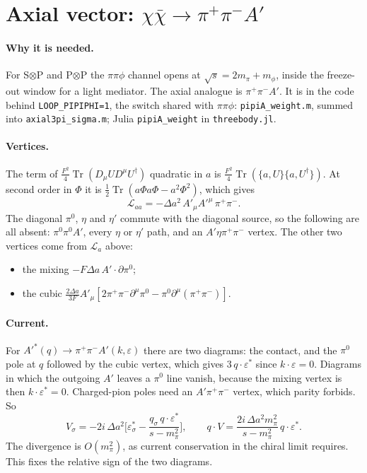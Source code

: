 \documentclass{article}
\newcommand{\tr}{\operatorname{Tr}}
\newcommand{\mpi}{m_\pi}
\newcommand{\Da}{\Delta a}
\begin{document}
\section{Axial vector: $\chi\bar\chi\to\pi^+\pi^-A'$}
\label{sec:pipiA}

\paragraph{Why it is needed.} For S$\otimes$P and P$\otimes$P the $\pi\pi\phi$ channel opens at
$\sqrt s=2m_\pi+m_\phi$, inside the freeze-out window for a light mediator. The axial analogue is
$\pi^+\pi^-A'$. It is in the code behind \texttt{LOOP\_PIPIPHI=1}, the switch shared with
$\pi\pi\phi$: \texttt{pipiA\_weight.m}, summed into \texttt{axial3pi\_sigma.m}; Julia
\texttt{pipiA\_weight} in \texttt{threebody.jl}.

\paragraph{Vertices.} The term of $\tfrac{F^2}{4}\tr(D_\mu U D^\mu U^\dagger)$ quadratic in $a$ is
$\tfrac{F^2}{4}\tr(\{a,U\}\{a,U^\dagger\})$. At second order in $\Phi$ it is
$\tfrac12\tr(a\Phi a\Phi-a^2\Phi^2)$, which gives
\begin{equation}
  \mathcal L_{aa}=-\Da^2\,A'_\mu A'^\mu\,\pi^+\pi^- .
\end{equation}
The diagonal $\pi^0$, $\eta$ and $\eta'$ commute with the diagonal source, so the following are all
absent: $\pi^0\pi^0A'$, every $\eta$ or $\eta'$ path, and an $A'\eta\pi^+\pi^-$ vertex. The other
two vertices come from $\mathcal L_a$ above:
\begin{itemize}
\item the mixing $-F\Da\,A'\!\cdot\partial\pi^0$;
\item the cubic $\tfrac{2\Da}{3F}A'_\mu[2\pi^+\pi^-\partial^\mu\pi^0-\pi^0\partial^\mu(\pi^+\pi^-)]$.
\end{itemize}

\paragraph{Current.} For $A'^*(q)\to\pi^+\pi^-A'(k,\varepsilon)$ there are two diagrams: the
contact, and the $\pi^0$ pole at $q$ followed by the cubic vertex, which gives $3\,q\!\cdot\!\varepsilon^*$
since $k\cdot\varepsilon=0$. Diagrams in which the outgoing $A'$ leaves a $\pi^0$ line vanish,
because the mixing vertex is then $k\cdot\varepsilon^*=0$. Charged-pion poles need an
$A'\pi^+\pi^-$ vertex, which parity forbids. So
\begin{equation}
  V_\sigma=-2i\,\Da^2\Big[\varepsilon^*_\sigma-\frac{q_\sigma\,q\cdot\varepsilon^*}{s-\mpi^2}\Big],
  \qquad
  q\cdot V=\frac{2i\,\Da^2\mpi^2}{s-\mpi^2}\,q\cdot\varepsilon^* .
\end{equation}
The divergence is $O(\mpi^2)$, as current conservation in the chiral limit requires. This fixes the
relative sign of the two diagrams.
\end{document}
